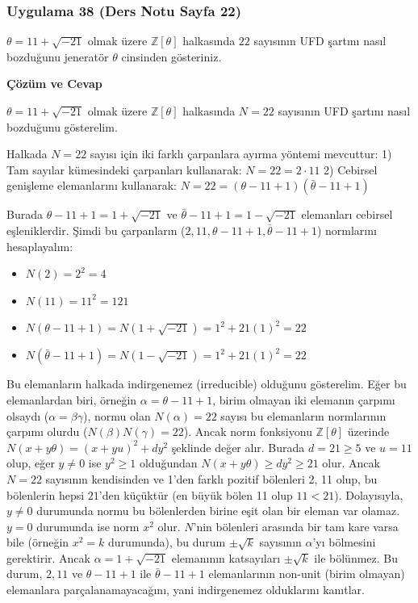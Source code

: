 \documentclass[11pt, a4paper]{article}
\newenvironment{cozum}{
    \vspace{0.5cm}
    \noindent\textcolor{green!60!black}{\faCheckCircle\enspace \textbf{\Large Çözüm ve Cevap}}\par\vspace{0.2cm}
}{}
\begin{document}
\subsubsection{Uygulama 38 (Ders Notu Sayfa 22)}
\begin{sorubox}
$\theta = 11 + \sqrt{-21}$ olmak üzere $\mathbb{Z}[\theta]$ halkasında $22$ sayısının UFD şartını nasıl bozduğunu jeneratör $\theta$ cinsinden gösteriniz.
\end{sorubox}
\begin{cozum}
$\theta = 11 + \sqrt{-21}$ olmak üzere $\mathbb{Z}[\theta]$ halkasında $N = 22$ sayısının UFD şartını nasıl bozduğunu gösterelim.

Halkada $N = 22$ sayısı için iki farklı çarpanlara ayırma yöntemi mevcuttur:
1) Tam sayılar kümesindeki çarpanları kullanarak: $N = 22 = 2 \cdot 11$
2) Cebirsel genişleme elemanlarını kullanarak: $N = 22 = (\theta - 11 + 1)(\bar{\theta} - 11 + 1)$

Burada $\theta - 11 + 1 = 1 + \sqrt{-21}$ ve $\bar{\theta} - 11 + 1 = 1 - \sqrt{-21}$ elemanları cebirsel eşleniklerdir. Şimdi bu çarpanların ($2, 11, \theta - 11 + 1, \bar{\theta} - 11 + 1$) normlarını hesaplayalım:
\begin{itemize}
    \item $N(2) = 2^2 = 4$
    \item $N(11) = 11^2 = 121$
    \item $N(\theta - 11 + 1) = N(1 + \sqrt{-21}) = 1^2 + 21(1)^2 = 22$
    \item $N(\bar{\theta} - 11 + 1) = N(1 - \sqrt{-21}) = 1^2 + 21(1)^2 = 22$
\end{itemize}

Bu elemanların halkada indirgenemez (irreducible) olduğunu gösterelim. Eğer bu elemanlardan biri, örneğin $\alpha = \theta - 11 + 1$, birim olmayan iki elemanın çarpımı olsaydı ($\alpha = \beta \gamma$), normu olan $N(\alpha) = 22$ sayısı bu elemanların normlarının çarpımı olurdu ($N(\beta)N(\gamma) = 22$). Ancak norm fonksiyonu $\mathbb{Z}[\theta]$ üzerinde $N(x+y\theta) = (x+yu)^2 + dy^2$ şeklinde değer alır. Burada $d = 21 \ge 5$ ve $u = 11$ olup, eğer $y \neq 0$ ise $y^2 \ge 1$ olduğundan $N(x+y\theta) \ge dy^2 \ge 21$ olur. Ancak $N = 22$ sayısının kendisinden ve 1'den farklı pozitif bölenleri 2, 11 olup, bu bölenlerin hepsi $21$'den küçüktür (en büyük bölen 11 olup $11 < 21$). Dolayısıyla, $y \neq 0$ durumunda normu bu bölenlerden birine eşit olan bir eleman var olamaz. $y = 0$ durumunda ise norm $x^2$ olur. $N$'nin bölenleri arasında bir tam kare varsa bile (örneğin $x^2 = k$ durumunda), bu durum $\pm \sqrt{k}$ sayısının $\alpha$'yı bölmesini gerektirir. Ancak $\alpha = 1+\sqrt{-21}$ elemanının katsayıları $\pm \sqrt{k}$ ile bölünmez. Bu durum, $2, 11$ ve $\theta - 11 + 1$ ile $\bar{\theta} - 11 + 1$ elemanlarının non-unit (birim olmayan) elemanlara parçalanamayacağını, yani indirgenemez olduklarını kanıtlar.


\end{cozum}
\end{document}
